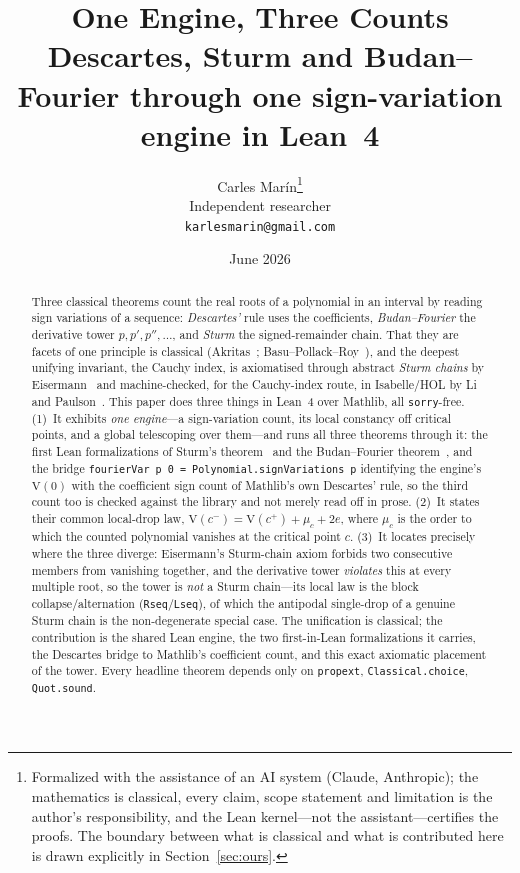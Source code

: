 \documentclass[11pt]{article}
\title{\bf One Engine, Three Counts\\[4pt]
  \large\normalfont Descartes, Sturm and Budan--Fourier through one sign-variation engine in Lean~4}
\author{Carles Mar\'in\thanks{Formalized with the assistance of an AI system (Claude, Anthropic);
the mathematics is classical, every claim, scope statement and limitation is the author's
responsibility, and the Lean kernel---not the assistant---certifies the proofs. The boundary between
what is classical and what is contributed here is drawn explicitly in Section~\ref{sec:ours}.}\\[3pt]
  \normalsize Independent researcher\\
  \normalsize \texttt{karlesmarin@gmail.com}}
\date{June 2026}
\newcommand{\lean}[1]{\texttt{#1}}
\newcommand{\V}{\mathrm{V}}
\begin{document}
\maketitle

\begin{abstract}
Three classical theorems count the real roots of a polynomial in an interval by reading sign
variations of a sequence: \emph{Descartes'} rule uses the coefficients, \emph{Budan--Fourier} the
derivative tower $p,p',p'',\dots$, and \emph{Sturm} the signed-remainder chain. That they are facets
of one principle is classical (Akritas~\cite{akritas}; Basu--Pollack--Roy~\cite{bpr}), and the deepest
unifying invariant, the Cauchy index, is axiomatised through abstract \emph{Sturm chains} by
Eisermann~\cite{eisermann} and machine-checked, for the Cauchy-index route, in Isabelle/HOL by Li and
Paulson~\cite{liCauchy}. This paper does three things in Lean~4 over Mathlib, all \lean{sorry}-free.
(1)~It exhibits \emph{one engine}---a sign-variation count, its local constancy off critical points,
and a global telescoping over them---and runs all three theorems through it: the first Lean
formalizations of Sturm's theorem~\cite{sturmlean} and the Budan--Fourier theorem~\cite{budanlean},
and the bridge \lean{fourierVar p 0 = Polynomial.signVariations p} identifying the engine's $\V(0)$
with the coefficient sign count of Mathlib's own Descartes' rule, so the third count too is checked
against the library and not merely read off in prose. (2)~It states their common local-drop law,
$\V(c^-)=\V(c^+)+\mu_c+2e$, where $\mu_c$ is the order to which the counted polynomial vanishes at the
critical point $c$. (3)~It locates precisely where the three diverge: Eisermann's Sturm-chain axiom
forbids two consecutive members from vanishing together, and the derivative tower \emph{violates} this
at every multiple root, so the tower is \emph{not} a Sturm chain---its local law is the block
collapse/alternation (\lean{Rseq}/\lean{Lseq}), of which the antipodal single-drop of a genuine Sturm
chain is the non-degenerate special case. The unification is classical; the contribution is the shared
Lean engine, the two first-in-Lean formalizations it carries, the Descartes bridge to Mathlib's
coefficient count, and this exact axiomatic placement of the tower. Every headline theorem depends only on \lean{propext}, \lean{Classical.choice}, \lean{Quot.sound}.
\end{abstract}
\end{document}

